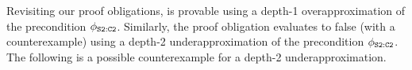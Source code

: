 Revisiting our proof obligations, 
is provable using a depth-1 overapproximation of the precondition ${\phi_{\tt S2:C2}}$.
Similarly, the proof obligation
evaluates to false (with a counterexample) using
a depth-2 underapproximation of the precondition ${\phi_{\tt S2:C2}}$.
The following is a possible counterexample for a depth-2 underapproximation.
%
